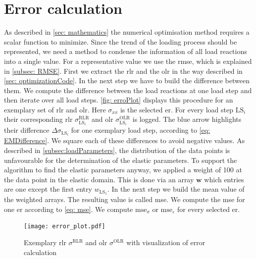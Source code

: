 \section{Error calculation}\label{sec: errorCalculation}
As described in \autoref{sec: mathematics} the numerical optimisation method requires a scalar function to minimize. 
Since the trend of the loading process should be represented, we need a method to condense the information of all load reactions into a single value.  For a representative value we use the \acrfull{rmse}, which is explained in \autoref{subsec: RMSE}.
First we extract the \acrlong{rlr} and the \acrlong{olr} in the way described in \autoref{sec: optimizationCode}. In the next step we have to build the difference between them. We compute the difference between the load reactions at one load step and then iterate over all load steps. \autoref{fig: erroPlot} displays this procedure for an exemplary set of \acrlong{rlr} and \acrlong{olr}. Here $\sigma_{xx}$ is the selected \acrlong{er}. For every load step $\text{LS}_i$ their corresponding \acrfull{rlr} $\sigma_{\scriptscriptstyle\text{LS}_i}^{\scriptscriptstyle\text{RLR}}$ and \acrfull{olr} $\sigma_{\scriptscriptstyle\text{LS}_i}^{\scriptscriptstyle\text{OLR}}$ is logged. The blue arrow highlights their difference $\Delta\sigma_{\scriptscriptstyle\text{LS}_i}$ for one exemplary load step, according to \autoref{eq: EMDifference}. We square each of these differences to avoid negative values.  As described in \autoref{subsec:loadParameters}, the distribution of the data points is unfavourable for the determination of the elastic parameters. To support the algorithm to find the elastic parameters anyway, we applied a weight of 100 at the data point in the elastic domain. This is done via an array $\boldsymbol{w}$ which entries are one except the first entry $w_{\scriptscriptstyle\text{LS}_1}$. 
In the next step we build the mean value of the weighted arrays. The resulting value is called \acrfull{mse}. We compute the \acrshort{mse} for one \acrlong{er} according to \autoref{eq: mse}. We compute $\text{mse}_{\sigma}$ or $\text{mse}_{\varepsilon}$ for every selected \acrlong{er}. 

\begin{figure}[H]
    \centering
    \texttt{[image: error\_plot.pdf]}
    \caption{Exemplary \acrlong{rlr} $\sigma^{\scriptscriptstyle\text{RLR}}$ and \acrlong{olr} $\sigma^{\scriptscriptstyle\text{OLR}}$ with visualization of error calculation}
    \label{fig: erroPlot}
\end{figure}


